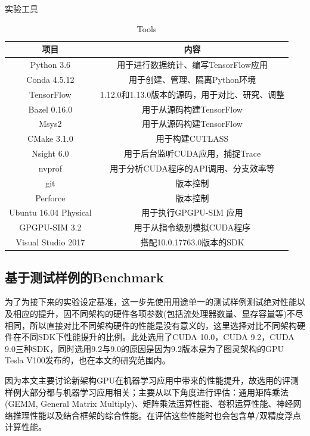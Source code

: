 \begin{table}
	\centering
	\renewcommand{\thetable}{\arabic{section}-\arabic{table} }
	\renewcommand{\tablename}{表}
	\caption{实验工具}
	\addtocounter{table}{-1}
	\renewcommand{\thetable}{\arabic{section}-\arabic{table} }
	\renewcommand{\tablename}{Table}
	\caption{Tools}
	\begin{tabular}{cc}
		\toprule
		项目	&	内容\\
		\midrule
		Python 3.6		&	用于进行数据统计、编写TensorFlow应用\\
		Conda 4.5.12		&	用于创建、管理、隔离Python环境\\
		TensorFlow		&	1.12.0和1.13.0版本的源码，用于对比、研究、调整\\
		Bazel 0.16.0		&	用于从源码构建TensorFlow\\
		Msys2		&	用于从源码构建TensorFlow\\
		CMake 3.1.0		&	用于构建CUTLASS\\	
		Nsight 6.0	&	用于后台监听CUDA应用，捕捉Trace\\
		nvprof		&	用于分析CUDA程序的API调用、分支效率等\\
		git			&	版本控制\\
		Perforce	&	版本控制\\
		Ubuntu 16.04 Physical & 用于执行GPGPU-SIM 应用\\
		GPGPU-SIM 3.2 & 用于从指令级别模拟CUDA程序\\
		Visual Studio 2017 & 搭配10.0.17763.0版本的SDK\\
		\bottomrule
	\end{tabular} \label{table-实验工具} 
\end{table}
\subsection{基于测试样例的Benchmark}
\par 为了为接下来的实验设定基准，这一步先使用用途单一的测试样例测试绝对性能以及相应的提升，因不同架构的硬件各项参数(包括流处理器数量、显存容量等)不尽相同，所以直接对比不同架构硬件的性能是没有意义的，这里选择对比不同架构硬件在不同SDK下性能提升的比例。此处选用了CUDA 10.0，CUDA 9.2，CUDA 9.0三种SDK，同时选用9.2与9.0的原因是因为9.2版本是为了图灵架构的GPU Tesla V100发布的\cite{CUDA92}，也在本文的研究范围内。
\par 因为本文主要讨论新架构GPU在机器学习应用中带来的性能提升，故选用的评测样例大部分都与机器学习应用相关；主要从以下角度进行评估：通用矩阵乘法(GEMM, General Matrix Multiply)、矩阵乘法运算性能、卷积运算性能、神经网络推理性能以及结合框架的综合性能。在评估这些性能时也会包含单/双精度浮点计算性能。
